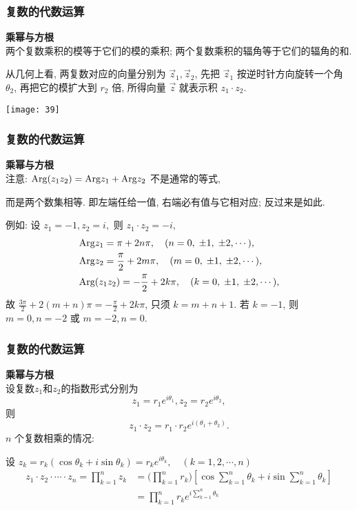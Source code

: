 \documentclass{beamer}
\begin{document}
\begin{frame}[t]
\frametitle{复数的代数运算}
\textbf{乘幂与方根}\\
两个复数乘积的模等于它们的模的乘积; 两个复数乘积的辐角等于它们的辐角的和.

\begin{minipage}[b]{0.5\linewidth}
从几何上看, 两复数对应的向量分别为 $ {\vec z_1}, {\vec z_2} $,  先把 $ {{\vec z}_1} $ 按逆时针方向旋转一个角 $ {\theta _{2}} $,  再把它的模扩大到 $ {r_2} $ 倍, 所得向量 $ \vec z $ 就表示积 $ {z_1} \cdot {z_2} $. 
\end{minipage}\qquad
\begin{minipage}[b]{0.35\linewidth}
\texttt{[image: 39]}
\end{minipage}
\end{frame}

\begin{frame}[t]
\frametitle{复数的代数运算}
\textbf{乘幂与方根}\\
注意:  $ {\rm{Arg}}({z_1}{z_2}) = {\rm{Arg}}{z_1} + {\rm{Arg}}{z_2} $ 不是通常的等式, 

而是两个数集相等. 即左端任给一值,  右端必有值与它相对应; 反过来是如此.

例如: 设 $ {z_1} = - 1, {z_2} = i, $ 则 $ {z_1} \cdot {z_2} = - i, $ 
\begin{align*}
&{\rm{Arg}}{z_1} = \pi + 2n\pi, \quad (n = 0, \; \pm 1, \; \pm 2, \cdots ), \\
&{\rm{Arg}}{z_2} = \frac{\pi }{2} + 2m\pi, \quad (m = 0, \; \pm 1, \; \pm 2, \cdots ), \\
&{\rm{Arg(}}{z_1}{z_2}) = - \frac{\pi}{2} + 2k\pi, \quad (k = 0, \; \pm 1, \; \pm 2, \cdots ), 
\end{align*}
故 $ \frac{{3\pi }}{2} + 2(m + n)\pi = - \frac{\pi }{2} + 2k\pi $,  只须 $ k = m + n + 1. $ 
若 $ k = - 1 $,  则 $ m = 0, n = - 2 $ 或 $ m = - 2, n = 0 $. 
\end{frame}

\begin{frame}[t]
\frametitle{复数的代数运算}
\textbf{乘幂与方根}\\
设复数$z_1$和$z_2$的指数形式分别为
\[{z_1} = {r_1}{e^{i{\theta _1}}}, {z_2} = {r_2}{e^{i{\theta _2}}}, \]
则
\[{z_1} \cdot {z_2} = {r_1} \cdot {r_2}{e^{i({\theta _1} + {\theta _2})}}.\]
 $ n $ 个复数相乘的情况: 

设 $ {z_k} = {r_k}(\cos {\theta _k} + i\sin {\theta _k}) = {r_k}{e^{i{\theta _k}}}, \quad (k = 1, 2, \cdots, n) $ 
\begin{align*}
{z_1} \cdot {z_2} \cdot \cdots \cdot {z_n} = \prod\limits_{k = 1}^n {{z_k}} &= (\prod\limits_{k = 1}^n {{r_k})[\cos \sum\limits_{k = 1}^n {{\theta _k}} + i\sin \sum\limits_{k = 1}^n {{\theta _k}} ]} \\
& = \prod\limits_{k = 1}^n {{r_k}{e^{i\sum\limits_{k = 1}^n {{\theta _k}} }}}
\end{align*}
\end{frame}
\end{document}
